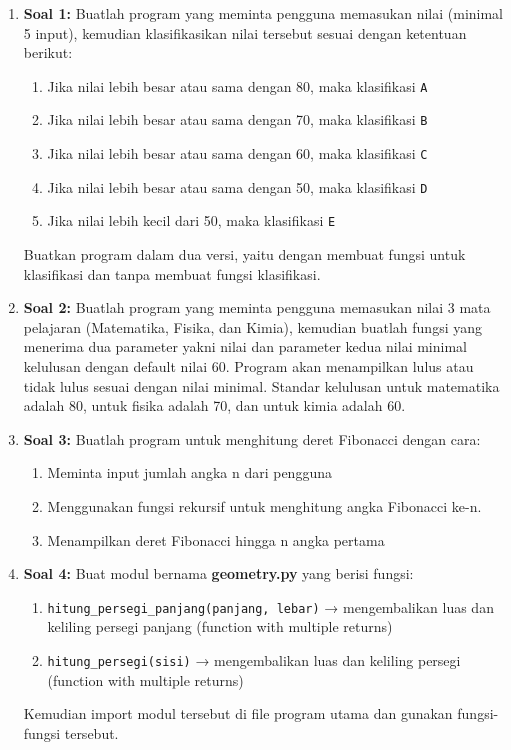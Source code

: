 \begin{enumerate}
    \item \textbf{Soal 1:} Buatlah program yang meminta pengguna memasukan nilai (minimal 5 input), kemudian klasifikasikan nilai tersebut sesuai dengan ketentuan berikut:
    \begin{enumerate}
        \item Jika nilai lebih besar atau sama dengan 80, maka klasifikasi \texttt{A}
        \item Jika nilai lebih besar atau sama dengan 70, maka klasifikasi \texttt{B}
        \item Jika nilai lebih besar atau sama dengan 60, maka klasifikasi \texttt{C}
        \item Jika nilai lebih besar atau sama dengan 50, maka klasifikasi \texttt{D}
        \item Jika nilai lebih kecil dari 50, maka klasifikasi \texttt{E}
    \end{enumerate}
    Buatkan program dalam dua versi, yaitu dengan membuat fungsi untuk klasifikasi dan tanpa membuat fungsi klasifikasi.

    \item \textbf{Soal 2:} Buatlah program yang meminta pengguna memasukan nilai 3 mata pelajaran (Matematika, Fisika, dan Kimia), kemudian buatlah fungsi yang menerima dua parameter yakni nilai dan parameter kedua nilai minimal kelulusan dengan default nilai 60. Program akan menampilkan lulus atau tidak lulus sesuai dengan nilai minimal. Standar kelulusan untuk matematika adalah 80, untuk fisika adalah 70, dan untuk kimia adalah 60.

    \item \textbf{Soal 3:} Buatlah program untuk menghitung deret Fibonacci dengan cara:
    \begin{enumerate}
        \item Meminta input jumlah angka n dari pengguna
        \item Menggunakan fungsi rekursif untuk menghitung angka Fibonacci ke-n.
        \item Menampilkan deret Fibonacci hingga n angka pertama
    \end{enumerate}

    \item \textbf{Soal 4:} Buat modul bernama \textbf{geometry.py} yang berisi fungsi:
    \begin{enumerate}
        \item \texttt{hitung_persegi_panjang(panjang, lebar)} → mengembalikan luas dan keliling persegi panjang (function with multiple returns)
        \item \texttt{hitung_persegi(sisi)} → mengembalikan luas dan keliling persegi (function with multiple returns)
    \end{enumerate}
    Kemudian import modul tersebut di file program utama dan gunakan fungsi-fungsi tersebut.

\end{enumerate}